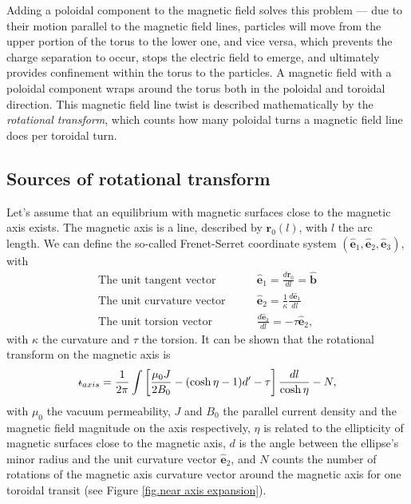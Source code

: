 \documentclass[my_thesis.tex]{subfiles}
\begin{document}
Adding a poloidal component to the magnetic field solves this problem --- due to their motion parallel to the magnetic field lines, particles will move from the upper portion of the torus to the lower one, and vice versa, which prevents the charge separation to occur, stops the electric field to emerge, and ultimately provides confinement within the torus to the particles. A magnetic field with a poloidal component wraps around the torus both in the poloidal and toroidal direction. This magnetic field line twist is described mathematically by the \emph{rotational transform}, which counts how many poloidal turns a magnetic field line does per toroidal turn. 

\subsection{Sources of rotational transform} 
Let's assume that an equilibrium with magnetic surfaces close to the magnetic axis exists. The magnetic axis is a line, described by $\mathbf{r}_0(l)$, with $l$ the arc length. We can define the so-called Frenet-Serret coordinate system $(\hat{\mathbf{e}}_1,\hat{\mathbf{e}}_2,\hat{\mathbf{e}}_3)$, with 
\begin{align}
    \text{The unit tangent vector}\qquad &\hat{\mathbf{e}}_1=\frac{d\mathbf{r}_0}{dl} = \hat{\mathbf{b}}\\
    \text{The unit curvature vector}\qquad &\hat{\mathbf{e}}_2=\frac{1}{\kappa}\frac{d\hat{\mathbf{e}}_1}{dl}\\
    \text{The unit torsion vector}\qquad &\frac{d\hat{\mathbf{e}}_3}{dl}= -\tau \hat{\mathbf{e}}_2,
\end{align} 
with $\kappa$ the curvature and $\tau$ the torsion. It can be shown \citep{Mercier1964} that the rotational transform on the magnetic axis is
\begin{equation}
    \text{$\iota\!\!$-}_{axis} = \frac{1}{2\pi}\int\left[\frac{\mu_0 J}{2B_0}-(\cosh\eta-1)d'-\tau\right]\frac{dl}{\cosh\eta} - N,
\end{equation}
with $\mu_0$ the vacuum permeability, $J$ and $B_0$ the parallel current density and the magnetic field magnitude on the axis respectively, $\eta$ is related to the ellipticity of magnetic surfaces close to the magnetic axis, $d$ is the angle between the ellipse's minor radius and the unit curvature vector $\hat{\mathbf{e}}_2$, and $N$ counts the number of rotations of the magnetic axis curvature vector around the magnetic axis for one toroidal transit (see Figure \ref{fig.near axis expansion}). 
\end{document}
